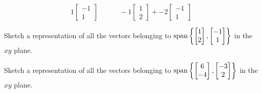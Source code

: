 \begin{applicationActivities}
\begin{activity}{10}
\begin{subactivity}
\[    1\begin{bmatrix}-1\\1\end{bmatrix}\hspace{3em}
    -1\begin{bmatrix}1\\2\end{bmatrix}+
    -2\begin{bmatrix}-1\\1\end{bmatrix}
    \]
  \end{subactivity}
  \begin{subactivity}
    Sketch a representation of all the vectors belonging to
    \(\operatorname{span}\left\{\begin{bmatrix}1\\2\end{bmatrix},
     \begin{bmatrix}-1\\1\end{bmatrix}\right\}\)
    in the \(xy\) plane.
  \end{subactivity}
\end{activity}

\begin{activity}{5}
    Sketch a representation of all the vectors belonging to
    \(\operatorname{span}\left\{\begin{bmatrix}6\\-4\end{bmatrix},
     \begin{bmatrix}-3\\2\end{bmatrix}\right\}\)
    in the \(xy\) plane.
\end{activity}


\end{applicationActivities}
